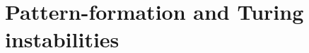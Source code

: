\documentclass[../main.tex]{subfiles}
\begin{document}
\section{Pattern-formation and Turing instabilities}\label{sec5}
\end{document}
